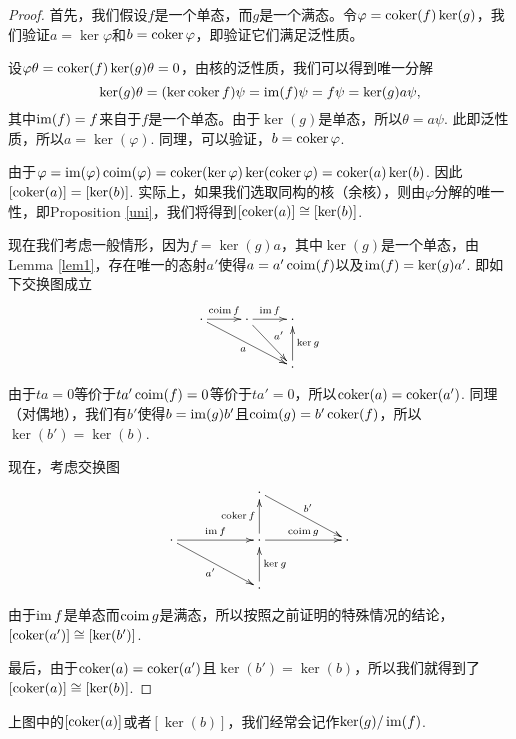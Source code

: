 \begin{proof}
首先，我们假设$f$是一个单态，而$g$是一个满态。令$\varphi=\operatorname{coker} (f) \ker (g)$，我们验证$a=\ker \varphi$和$b=\operatorname{coker} \varphi$，即验证它们满足泛性质。

设$\varphi \theta=\operatorname{coker} (f)\ker(g)\theta=0$，由核的泛性质，我们可以得到唯一分解
\[
	\ker(g)\theta=(\ker \operatorname{coker} f)\psi=\operatorname{im}(f)\psi=f\psi=\ker(g)a\psi,
\]
其中$\operatorname{im}(f)=f$来自于$f$是一个单态。由于$\ker(g)$是单态，所以$\theta=a\psi$. 此即泛性质，所以$a=\ker(\varphi)$. 同理，可以验证，$b=\operatorname{coker} \varphi$.

由于$\varphi=\operatorname{im}(\varphi)\operatorname{coim}(\varphi)=\operatorname{coker}(\ker \varphi)\ker(\operatorname{coker} \varphi)=\operatorname{coker}(a)\ker(b)$. 因此$[\operatorname{coker}(a)]=[\ker(b)]$. 实际上，如果我们选取同构的核（余核），则由$\varphi$分解的唯一性，即Proposition \ref{uni}，我们将得到$[\operatorname{coker}(a)]\cong [\ker(b)]$.

现在我们考虑一般情形，因为$f=\ker(g)a$，其中$\ker(g)$是一个单态，由Lemma \ref{lem1}，存在唯一的态射$a'$使得$a=a'\operatorname{coim}(f)$以及$\operatorname{im}(f)=\ker(g)a'$. 即如下交换图成立
\[
\begin{xy}
	\xymatrix{
	\cdot \ar[r]^{\coim f} \ar[rrd]_a&\cdot \ar[r]^{\im f} \ar[rd]^{a'}&\cdot \\
	&&\cdot \ar[u]_{\ker g}
	}
\end{xy}
\]
由于$ta=0$等价于$ta'\operatorname{coim}(f)=0$等价于$ta'=0$，所以$\operatorname{coker}(a)=\operatorname{coker}(a')$. 同理（对偶地），我们有$b'$使得$b=\operatorname{im}(g)b'$且$\operatorname{coim}(g)=b' \operatorname{coker}(f)$，所以$\ker(b')=\ker(b)$.

现在，考虑交换图
\[
\begin{xy}
	\xymatrix{
	&&\cdot \ar[rrd]^{b'}&&\\
	\cdot \ar[rr]^{\im f} \ar[rrd]_{a'}&&\cdot \ar[rr]^{\coim g}\ar[u]^{\coker f}&&\cdot\\
	&&\cdot \ar[u]_{\ker g}&&
	}
\end{xy}
\]
由于$\operatorname{im} f$是单态而$\operatorname{coim} g$是满态，所以按照之前证明的特殊情况的结论，$[\operatorname{coker}(a')]\cong [\ker(b')]$. 

最后，由于$\operatorname{coker}(a)=\operatorname{coker}(a')$且$\ker(b')=\ker(b)$，所以我们就得到了$[\operatorname{coker}(a)]\cong [\ker(b)]$.
\end{proof}

上图中的$[\operatorname{coker}(a)]$或者$[\ker(b)]$，我们经常会记作$\ker(g)/\operatorname{im}(f)$.